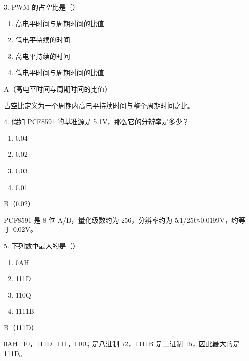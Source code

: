 \begin{question}{3. PWM 的占空比是（）}
\begin{enumerate}[label=\Alph*., leftmargin=2.4em, itemsep=0.2em]
\item 高电平时间与周期时间的比值
\item 低电平持续的时间
\item 高电平持续的时间
\item 低电平时间与周期时间的比值
\end{enumerate}
\end{question}
\begin{answer}
A（高电平时间与周期时间的比值）
\end{answer}
\begin{explanation}
占空比定义为一个周期内高电平持续时间与整个周期时间之比。
\end{explanation}

\begin{question}{4. 假如 PCF8591 的基准源是 5.1V，那么它的分辨率是多少？}
\begin{enumerate}[label=\Alph*., leftmargin=2.4em, itemsep=0.2em]
\item 0.04
\item 0.02
\item 0.03
\item 0.01
\end{enumerate}
\end{question}
\begin{answer}
B（0.02）
\end{answer}
\begin{explanation}
PCF8591 是 8 位 A/D，量化级数约为 256，分辨率约为 5.1/256≈0.0199V，约等于 0.02V。
\end{explanation}

\begin{question}{5. 下列数中最大的是（）}
\begin{enumerate}[label=\Alph*., leftmargin=2.4em, itemsep=0.2em]
\item 0AH
\item 111D
\item 110Q
\item 1111B
\end{enumerate}
\end{question}
\begin{answer}
B（111D）
\end{answer}
\begin{explanation}
0AH=10，111D=111，110Q 是八进制 72，1111B 是二进制 15，因此最大的是 111D。
\end{explanation}

